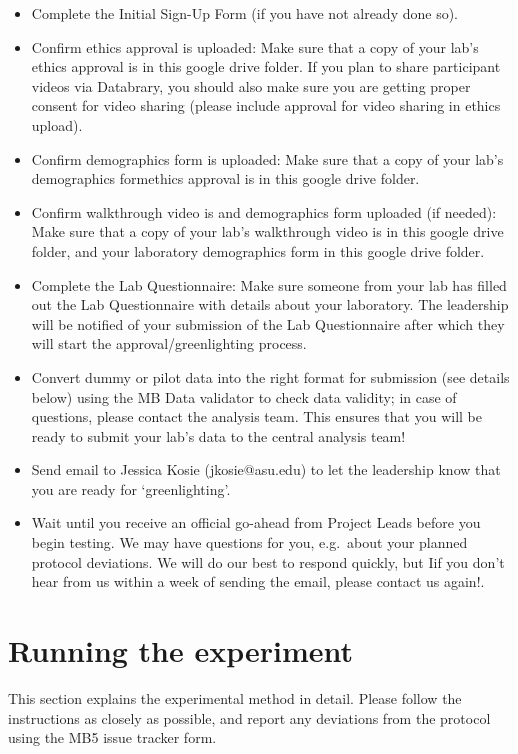\documentclass[
  letterpaper,
  DIV=11,
  numbers=noendperiod,
  oneside]{scrreprt}
\providecommand{\tightlist}{%
  \setlength{\itemsep}{0pt}\setlength{\parskip}{0pt}}
\begin{document}
\begin{itemize}
\tightlist
\item
  Complete the Initial Sign-Up Form (if you have not already done so).
\item
  Confirm ethics approval is uploaded: Make sure that a copy of your
  lab's ethics approval is in this google drive folder. If you plan to
  share participant videos via Databrary, you should also make sure you
  are getting proper consent for video sharing (please include approval
  for video sharing in ethics upload).
\item
  Confirm demographics form is uploaded: Make sure that a copy of your
  lab's demographics formethics approval is in this google drive folder.
\item
  Confirm walkthrough video is and demographics form uploaded (if
  needed): Make sure that a copy of your lab's walkthrough video is in
  this google drive folder, and your laboratory demographics form in
  this google drive folder.
\item
  Complete the Lab Questionnaire: Make sure someone from your lab has
  filled out the Lab Questionnaire with details about your laboratory.
  The leadership will be notified of your submission of the Lab
  Questionnaire after which they will start the approval/greenlighting
  process.
\item
  Convert dummy or pilot data into the right format for submission (see
  details below) using the MB Data validator to check data validity; in
  case of questions, please contact the analysis team. This ensures that
  you will be ready to submit your lab's data to the central analysis
  team!
\item
  Send email to Jessica Kosie (jkosie@asu.edu) to let the leadership
  know that you are ready for `greenlighting'.
\item
  Wait until you receive an official go-ahead from Project Leads before
  you begin testing. We may have questions for you, e.g.~about your
  planned protocol deviations. We will do our best to respond quickly,
  but Iif you don't hear from us within a week of sending the email,
  please contact us again!.
\end{itemize}

\part{Running the experiment}

This section explains the experimental method in detail. Please follow
the instructions as closely as possible, and report any deviations from
the protocol using the MB5 issue tracker form.
\end{document}

